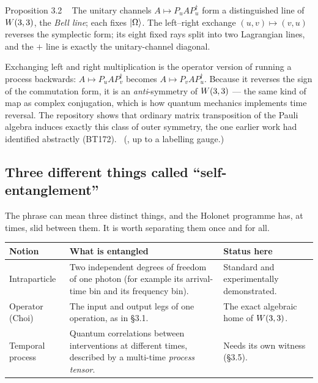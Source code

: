 \begin{result}{Proposition 3.2 \hfill \tierT\ \tierC}
The unitary channels $A\mapsto P_uAP_u^\dagger$ form a distinguished line of $W(3,3)$, the
\emph{Bell line}; each fixes $\lvert \Omega\rangle$. The left--right exchange
$(u,v)\mapsto(v,u)$ reverses the symplectic form; its eight fixed rays split into two
Lagrangian lines, and the $+$ line is exactly the unitary-channel diagonal.
\end{result}

\begin{physical}
Exchanging left and right multiplication is the operator version of running a process
backwards: $A\mapsto P_uAP_v^\dagger$ becomes $A\mapsto P_vAP_u^\dagger$. Because it
reverses the sign of the commutation form, it is an \emph{anti}-symmetry of $W(3,3)$ --- the
same kind of map as complex conjugation, which is how quantum mechanics implements time
reversal. The repository shows that ordinary matrix transposition of the Pauli algebra
induces exactly this class of outer symmetry, the one earlier work had identified
abstractly (BT172). \tierC\ (, up to a
labelling gauge.)
\end{physical}

\subsection{Three different things called ``self-entanglement''}

The phrase can mean three distinct things, and the Holonet programme has, at times, slid
between them. It is worth separating them once and for all.

\begin{center}
\small
\renewcommand{\arraystretch}{1.3}
\begin{tabularx}{\textwidth}{@{}p{3.1cm}Xp{3.6cm}@{}}
\toprule
\textbf{Notion} & \textbf{What is entangled} & \textbf{Status here}\\
\midrule
Intraparticle & Two independent degrees of freedom of one photon (for example its
arrival-time bin and its frequency bin). & Standard and experimentally demonstrated.\\
Operator (Choi) & The input and output legs of one operation, as in \S3.1. & The exact
algebraic home of $W(3,3)$.\\
Temporal process & Quantum correlations between interventions at different times,
described by a multi-time \emph{process tensor}. & Needs its own witness (\S3.5).\\
\bottomrule
\end{tabularx}
\end{center}

